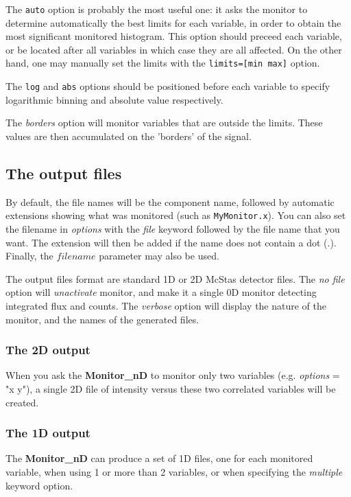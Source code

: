 The \verb+auto+ option is probably the most useful one: it asks the monitor to determine automatically the best limits for each variable, in order to obtain the most significant monitored histogram. This option should preceed each variable, or be located after all variables in which case they are all affected.
On the other hand, one may manually set the limits with the \verb+limits=[min max]+ option.

The \verb+log+ and \verb+abs+ options should be positioned before each variable to specify logarithmic binning and absolute value respectively.

The {\it borders} option will monitor variables that are outside
the limits. These values are then accumulated on the 'borders' of the
signal.

\subsection{The output files}

By default, the file names will be the component name, followed by
automatic extensions showing what was monitored (such as
\texttt{MyMonitor.x}). You can also set the filename in {\it options}
with the {\it file} keyword followed by the file name that you want. The
extension will then be added if the name does not contain a dot (.).
Finally, the $filename$ parameter may also be used.

The output files format are standard 1D or 2D McStas detector files.
The {\it no file} option will {\it unactivate} monitor, and make it a
single 0D monitor detecting integrated flux and counts.
The {\it verbose} option will display the nature of the monitor, and the
names of the generated files.

\subsubsection{The 2D output}

When you ask the {\bf Monitor\_nD} to monitor only two variables (e.g.
{\it options} = "x y"), a single 2D file of intensity versus these two
correlated variables will be created.

\subsubsection{The 1D output}

The {\bf Monitor\_nD} can produce a set of 1D files, one for each
monitored variable, when using 1 or more than 2 variables, or when
specifying the {\it multiple} keyword option.

